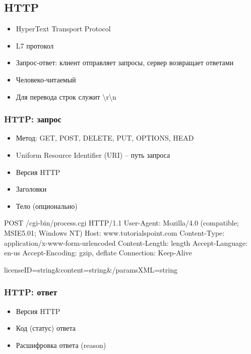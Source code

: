   \subsection{HTTP}
    \begin{itemize}
      \item HyperText Transport Protocol
      \item L7 протокол
      \item Запрос-ответ: клиент отправляет запросы, сервер возвращает ответами
      \item Человеко-читаемый
      \item Для перевода строк служит \textbackslash r\textbackslash n
    \end{itemize}
  
  \subsubsection{HTTP: запрос}
    \begin{itemize}
      \item Метод: GET, POST, DELETE, PUT, OPTIONS, HEAD
      \item Uniform Resource Identifier (URI) – путь запроса
      \item Версия HTTP
      \item Заголовки
      \item Тело (опционально)
    \end{itemize}
    
    \begin{bminted}
POST /cgi-bin/process.cgi HTTP/1.1
User-Agent: Mozilla/4.0 (compatible; MSIE5.01; Windows NT)
Host: www.tutorialspoint.com
Content-Type: application/x-www-form-urlencoded
Content-Length: length
Accept-Language: en-us
Accept-Encoding: gzip, deflate
Connection: Keep-Alive

licenseID=string&content=string&/paramsXML=string  
    \end{bminted}
  
  \subsubsection{HTTP: ответ}
    \begin{itemize}
      \item Версия HTTP
      \item Код (статус) ответа
      \item Расшифровка ответа (reason)
    \end{itemize}
    
